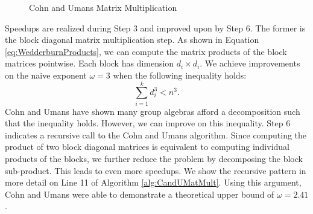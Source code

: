 \documentclass[../thesis.tex]{subfiles}
\begin{document}
\begin{figure}[t]
    \centering
    
    \label{fig:CandUmatmult}
        \caption{Cohn and Umans Matrix Multiplication}
\end{figure}

Speedups are realized during Step 3 and improved upon by Step 6. The former is the block diagonal matrix multiplication step. As shown in Equation \ref{eq:WedderburnProducts}, we can compute the matrix products of the block matrices pointwise. Each block has dimension $d_i\times d_i.$ We achieve improvements on the naive exponent $\omega = 3$ when the following inequality holds:
\begin{equation}
    \sum_{i=1}^k d_i^3 < n^3.
\end{equation}
Cohn and Umans have shown many group algebras afford a decomposition such that the inequality holds. However, we can improve on this inequality. Step 6 indicates a recursive call to the Cohn and Umans algorithm. Since computing the product of two block diagonal matrices is equivalent to computing individual products of the blocks, we further reduce the problem by decomposing the block sub-product. This leads to even more speedups. We show the recursive pattern in more detail on Line 11 of Algorithm \ref{alg:CandUMatMult}. Using this argument, Cohn and Umans were able to demonstrate a theoretical upper bound of $\omega = 2.41$ \cite{CohnNew}.  
\end{document}
